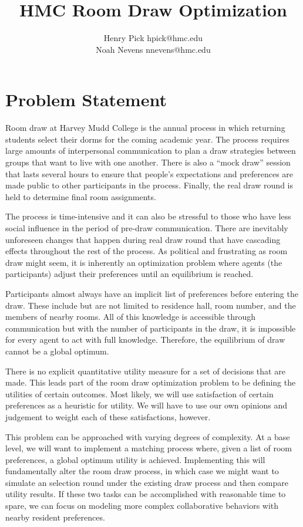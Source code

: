 \documentclass[12pt]{article}
\author{Henry Pick \small hpick@hmc.edu \\
\large Noah Nevens \small nnevens@hmc.edu}
\title{HMC Room Draw Optimization}
\begin{document}
    \maketitle
    \section*{Problem Statement}
    Room draw at Harvey Mudd College is the annual process in which returning students select their dorms for the coming academic year. The process requires large amounts of interpersonal communication to plan a draw strategies between groups that want to live with one another. There is also a ``mock draw'' session that lasts several hours to ensure that people's expectations and preferences are made public to other participants in the process. Finally, the real draw round is held to determine final room assignments.

    The process is time-intensive and it can also be stressful to those who have less social influence in the period of pre-draw communication. There are inevitably unforeseen changes that happen during real draw round that have cascading effects throughout the rest of the process. As political and frustrating as room draw might seem, it is inherently an optimization problem where agents (the participants) adjust their preferences until an equilibrium is reached. 

    Participants almost always have an implicit list of preferences before entering the draw. These include but are not limited to residence hall, room number, and the members of nearby rooms. All of this knowledge is accessible through communication but with the number of participants in the draw, it is impossible for every agent to act with full knowledge. Therefore, the equilibrium of draw cannot be a global optimum.
    
    There is no explicit quantitative utility measure for a set of decisions that are made. This leads part of the room draw optimization problem to be defining the utilities of certain outcomes. Most likely, we will use satisfaction of certain preferences as a heuristic for utility. We will have to use our own opinions and judgement to weight each of these satisfactions, however.

    This problem can be approached with varying degrees of complexity. At a base level, we will want to implement a matching process where, given a list of room preferences, a global optimum utility is achieved. Implementing this will fundamentally alter the room draw process, in which case we might want to simulate an selection round under the existing draw process and then compare utility results. If these two tasks can be accomplished with reasonable time to spare, we can focus on modeling more complex collaborative behaviors with nearby resident preferences.
\end{document}

